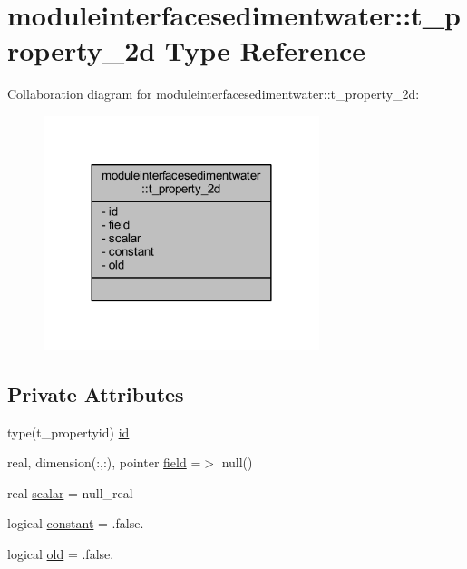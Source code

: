 \hypertarget{structmoduleinterfacesedimentwater_1_1t__property__2d}{}\section{moduleinterfacesedimentwater\+:\+:t\+\_\+property\+\_\+2d Type Reference}
\label{structmoduleinterfacesedimentwater_1_1t__property__2d}


Collaboration diagram for moduleinterfacesedimentwater\+:\+:t\+\_\+property\+\_\+2d\+:\nopagebreak
\begin{figure}[H]
\begin{center}
\leavevmode
\includegraphics[width=228pt]{structmoduleinterfacesedimentwater_1_1t__property__2d__coll__graph}
\end{center}
\end{figure}
\subsection*{Private Attributes}
\begin{DoxyCompactItemize}
\item 
type(t\+\_\+propertyid) \mbox{\hyperlink{structmoduleinterfacesedimentwater_1_1t__property__2d_a0b3fffcfa2ca1f5b094cd24b81c5b375}{id}}
\item 
real, dimension(\+:,\+:), pointer \mbox{\hyperlink{structmoduleinterfacesedimentwater_1_1t__property__2d_ab1cff33374a8a0e760e052b2df1a31b2}{field}} =$>$ null()
\item 
real \mbox{\hyperlink{structmoduleinterfacesedimentwater_1_1t__property__2d_a2693130c8f9b0f8eacd658762059a467}{scalar}} = null\+\_\+real
\item 
logical \mbox{\hyperlink{structmoduleinterfacesedimentwater_1_1t__property__2d_a8bae5e524f859dc2347b3325fab425a2}{constant}} = .false.
\item 
logical \mbox{\hyperlink{structmoduleinterfacesedimentwater_1_1t__property__2d_aad06511b63053d0d41183a10c1c3e601}{old}} = .false.
\end{DoxyCompactItemize}


